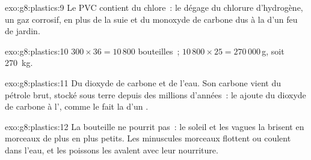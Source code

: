\begin{solution}{exo:g8:plastics:9}
Le PVC contient du chlore~: le  dégage du chlorure d'hydrogène, un
gaz corrosif, en plus de la suie et du monoxyde de carbone dus à la
 d'un feu de jardin.
\end{solution}

\begin{solution}{exo:g8:plastics:10}
$300 \times 36 = 10\,800$ bouteilles~; $10\,800 \times 25 = 270\,000$\,g,
soit \qty{270}{kg}.
\end{solution}

\begin{solution}{exo:g8:plastics:11}
Du dioxyde de carbone et de l'eau. Son carbone vient du pétrole brut,
stocké sous terre depuis des millions d'années~: le  ajoute du
dioxyde de carbone à l', comme le fait la  d'un .
\end{solution}

\begin{solution}{exo:g8:plastics:12}
La bouteille ne pourrit pas~: le soleil et les vagues la brisent en
morceaux de plus en plus petits. Les minuscules morceaux flottent ou
coulent dans l'eau, et les poissons les avalent avec leur nourriture.
\end{solution}

